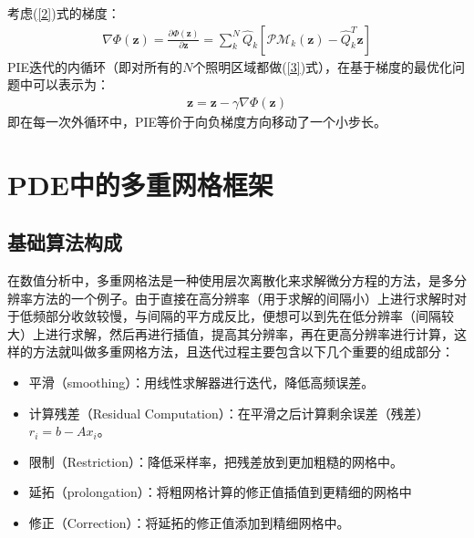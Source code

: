 \documentclass[10pt,aspectratio=169]{beamer} %
\renewcommand{\vec}[1]{\boldsymbol{#1}} %
\begin{document}
\begin{frame}
    考虑(\ref{2})式的梯度：
    \begin{align}
        \nabla  \Phi (\vec{z}) = \frac{\partial \Phi (\vec{z})}{\partial \vec{z}} = \sum_k^N \hat{Q}_k [\mathcal{PM}_k(\vec{z})-\hat{Q}_k^T \vec{z}]
    \end{align}
    PIE迭代的内循环（即对所有的$N$个照明区域都做(\ref{3})式），在基于梯度的最优化问题中可以表示为：
    \begin{align}
        \vec{z}=\vec{z}-\gamma \nabla \Phi (\vec{z})
    \end{align}
    即在每一次外循环中，PIE等价于向负梯度方向移动了一个小步长。
\end{frame}

\section{PDE中的多重网格框架}

\subsection{基础算法构成}

\begin{frame}
    在数值分析中，多重网格法是一种使用层次离散化来求解微分方程的方法，是多分辨率方法的一个例子。由于直接在高分辨率（用于求解的间隔小）上进行求解时对于低频部分收敛较慢，与间隔的平方成反比，便想可以到先在低分辨率（间隔较大）上进行求解，然后再进行插值，提高其分辨率，再在更高分辨率进行计算，这样的方法就叫做多重网格方法，且迭代过程主要包含以下几个重要的组成部分：
    \begin{itemize}
        \item 平滑（smoothing）：用线性求解器进行迭代，降低高频误差。
        \item 计算残差（Residual Computation）：在平滑之后计算剩余误差（残差）$r_i=b-Ax_i$。
        \item 限制（Restriction）：降低采样率，把残差放到更加粗糙的网格中。
        \item 延拓（prolongation）：将粗网格计算的修正值插值到更精细的网格中
        \item 修正（Correction）：将延拓的修正值添加到精细网格中。
    \end{itemize}
\end{frame}
\end{document}
